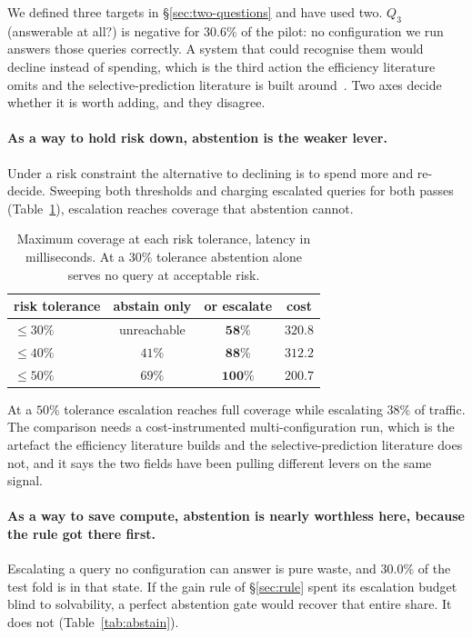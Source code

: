 \documentclass[10pt,twocolumn]{article}
\theoremstyle{plain}
\begin{document}
We defined three targets in \S\ref{sec:two-questions} and have used two.
$Q_3$ (answerable at all?) is negative for $30.6\%$ of the pilot: no
configuration we run answers those queries correctly. A system that could
recognise them would decline instead of spending, which is the third action the
efficiency literature omits and the selective-prediction literature is built
around~\cite{abstention,recoverr}. Two axes decide whether it is worth adding,
and they disagree.

\paragraph{As a way to hold risk down, abstention is the weaker lever.} Under a
risk constraint the alternative to declining is to spend more and re-decide.
Sweeping both thresholds and charging escalated queries for both passes
(Table~\ref{tab:coverage}), escalation reaches coverage that abstention cannot.

\begin{table}[h]
\centering\small
\begin{tabular}{lccc}
\toprule
risk tolerance & abstain only & or escalate & cost \\
\midrule
$\le 30\%$ & unreachable & $\mathbf{58\%}$ & $320.8$ \\
$\le 40\%$ & $41\%$ & $\mathbf{88\%}$ & $312.2$ \\
$\le 50\%$ & $69\%$ & $\mathbf{100\%}$ & $200.7$ \\
\bottomrule
\end{tabular}
\caption{Maximum coverage at each risk tolerance, latency in milliseconds. At a
$30\%$ tolerance abstention alone serves no query at acceptable risk.}
\label{tab:coverage}
\end{table}

At a $50\%$ tolerance escalation reaches full coverage while escalating $38\%$
of traffic. The comparison needs a cost-instrumented multi-configuration run,
which is the artefact the efficiency literature builds and the
selective-prediction literature does not, and it says the two fields have been
pulling different levers on the same signal.

\paragraph{As a way to save compute, abstention is nearly worthless
here, because the rule got there first.} Escalating a query no configuration
can answer is pure waste, and $30.0\%$ of the test fold is in that state. If the
gain rule of \S\ref{sec:rule} spent its escalation budget blind to solvability,
a perfect abstention gate would recover that entire share. It does not
(Table~\ref{tab:abstain}).
\end{document}
